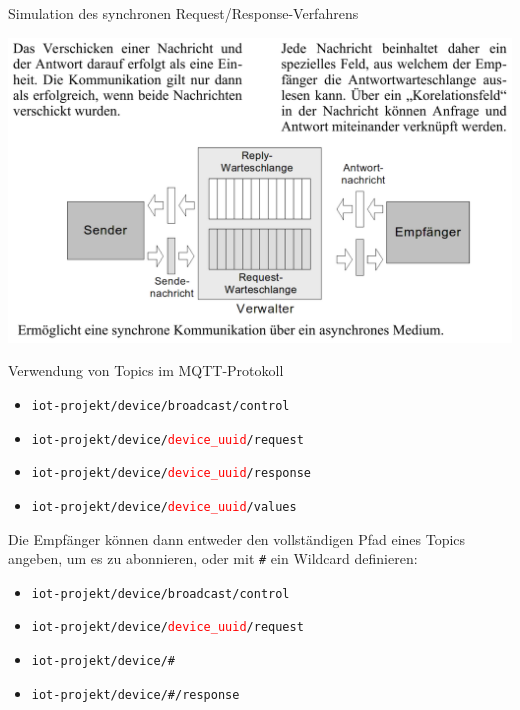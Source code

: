 \begin{frame}{Simulation des synchronen Request/Response-Verfahrens }
    \begin{center}
        \includegraphics[width=\linewidth]{img/mqtt7}
    \end{center}
\end{frame}

{
\small

\begin{frame}{Verwendung von Topics im MQTT-Protokoll}

    \smallskip

    \begin{itemize}
        \item \texttt{iot-projekt/device/broadcast/control}
        \item \texttt{iot-projekt/device/\textcolor{red}{device\_uuid}/request}
        \item \texttt{iot-projekt/device/\textcolor{red}{device\_uuid}/response}
        \item \texttt{iot-projekt/device/\textcolor{red}{device\_uuid}/values}
    \end{itemize}

    \medskip

    Die Empfänger können dann entweder den vollständigen Pfad eines Topics
    angeben, um es zu abonnieren, oder mit \texttt{\#} ein Wildcard definieren:

    \smallskip

    \begin{itemize}
        \item \texttt{iot-projekt/device/broadcast/control}
        \item \texttt{iot-projekt/device/\textcolor{red}{device\_uuid}/request}
        \item \texttt{iot-projekt/device/\#}
        \item \texttt{iot-projekt/device/\#/response}
    \end{itemize}
\end{frame}
}

